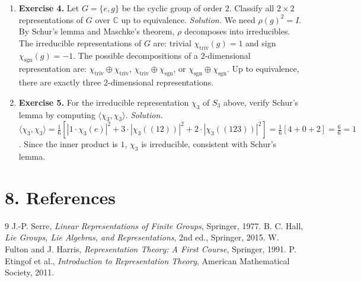\begin{enumerate}[leftmargin=*,itemsep=0.9em]
\item \textbf{Exercise 4.} Let $G=\{e,g\}$ be the cyclic group of order $2$. Classify all $2\times 2$ representations of $G$ over $\mathbb{C}$ up to equivalence. \emph{Solution.} We need $\rho(g)^2=I$. By Schur's lemma and Maschke's theorem, $\rho$ decomposes into irreducibles. The irreducible representations of $G$ are: trivial $\chi_{\text{triv}}(g)=1$ and sign $\chi_{\text{sgn}}(g)=-1$. The possible decompositions of a $2$-dimensional representation are: $\chi_{\text{triv}}\oplus\chi_{\text{triv}}$, $\chi_{\text{triv}}\oplus\chi_{\text{sgn}}$, or $\chi_{\text{sgn}}\oplus\chi_{\text{sgn}}$. Up to equivalence, there are exactly three $2$-dimensional representations.

\item \textbf{Exercise 5.} For the irreducible representation $\chi_3$ of $S_3$ above, verify Schur's lemma by computing $\langle\chi_3,\chi_3\rangle$. \emph{Solution.} $\langle\chi_3,\chi_3\rangle=\frac{1}{6}[|1\cdot\chi_3(e)|^2+3\cdot|\chi_3((12))|^2+2\cdot|\chi_3((123))|^2]=\frac{1}{6}[4+0+2]=\frac{6}{6}=1$. Since the inner product is $1$, $\chi_3$ is irreducible, consistent with Schur's lemma.

\end{enumerate}
\section*{8. References}
\begin{thebibliography}{9}
 J.-P. Serre, \emph{Linear Representations of Finite Groups}, Springer, 1977.
 B. C. Hall, \emph{Lie Groups, Lie Algebras, and Representations}, 2nd ed., Springer, 2015.
 W. Fulton and J. Harris, \emph{Representation Theory: A First Course}, Springer, 1991.
 P. Etingof et al., \emph{Introduction to Representation Theory}, American Mathematical Society, 2011.
\end{thebibliography}
